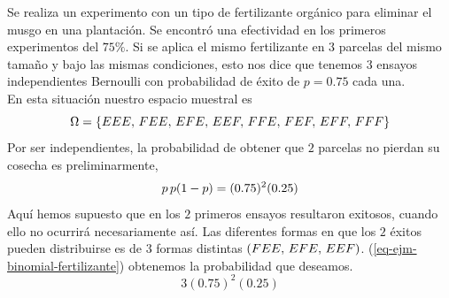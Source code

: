 \begin{Ejm}
    Se realiza un experimento con un tipo de fertilizante orgánico para eliminar el musgo en una plantación. Se encontró una efectividad en los primeros experimentos del $75\%$.
    Si se aplica el mismo fertilizante en $3$ parcelas del mismo tamaño y bajo las mismas condiciones, esto nos dice que tenemos $3$ ensayos independientes Bernoulli con probabilidad de éxito de $p=0.75$  cada una.\\
    En esta situación nuestro espacio muestral es $$\Omega= \{E E E,\thinspace F E E,\thinspace E F E,\thinspace E E F,\thinspace F F E,\thinspace F E F,\thinspace E F F,\thinspace F F F\}$$
    Por ser independientes, la probabilidad de obtener que $2$ parcelas no pierdan su cosecha es preliminarmente,
    \begin{eqnarray}
        \label{eq-ejm-binomial-fertilizante}
    	p\thinspace p (1-p)=(0.75)^2(0.25)
    \end{eqnarray}
    Aquí hemos supuesto que en los  $2$ primeros ensayos resultaron exitosos, cuando ello no ocurrirá necesariamente así. Las diferentes formas en que los $2$ éxitos pueden distribuirse es de $3$ formas distintas $(F E E,\thinspace E F E,\thinspace E E F)$. (\ref{eq-ejm-binomial-fertilizante}) obtenemos la probabilidad que deseamos. $$3(0.75)^2(0.25)$$
\end{Ejm}

